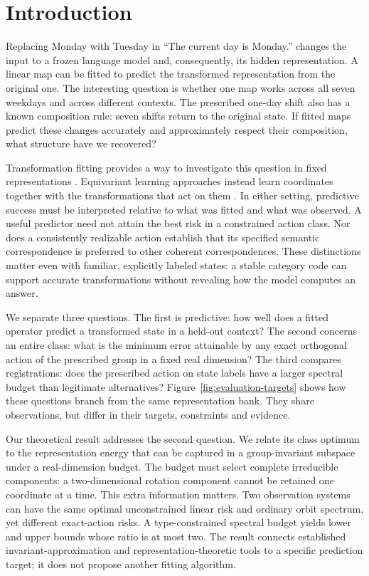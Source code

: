 \section{Introduction}
Replacing Monday with Tuesday in ``The current day is Monday.'' changes the input to a frozen language model and, consequently, its hidden representation. A linear map can be fitted to predict the transformed representation from the original one. The interesting question is whether one map works across all seven weekdays and across different contexts. The prescribed one-day shift also has a known composition rule: seven shifts return to the original state. If fitted maps predict these changes accurately and approximately respect their composition, what structure have we recovered?

Transformation fitting provides a way to investigate this question in fixed representations \citep{lenc2015understanding,sun2026transformationlaws}. Equivariant learning approaches instead learn coordinates together with the transformations that act on them \citep{schmidt2025equivariance}. In either setting, predictive success must be interpreted relative to what was fitted and what was observed. A useful predictor need not attain the best risk in a constrained action class. Nor does a consistently realizable action establish that its specified semantic correspondence is preferred to other coherent correspondences. These distinctions matter even with familiar, explicitly labeled states: a stable category code can support accurate transformations without revealing how the model computes an answer.

We separate three questions. The first is predictive: how well does a fitted operator predict a transformed state in a held-out context? The second concerns an entire class: what is the minimum error attainable by any exact orthogonal action of the prescribed group in a fixed real dimension? The third compares registrations: does the prescribed action on state labels have a larger spectral budget than legitimate alternatives? Figure~\ref{fig:evaluation-targets} shows how these questions branch from the same representation bank. They share observations, but differ in their targets, constraints and evidence.

Our theoretical result addresses the second question. We relate its class optimum to the representation energy that can be captured in a group-invariant subspace under a real-dimension budget. The budget must select complete irreducible components: a two-dimensional rotation component cannot be retained one coordinate at a time. This extra information matters. Two observation systems can have the same optimal unconstrained linear risk and ordinary orbit spectrum, yet different exact-action risks. A type-constrained spectral budget yields lower and upper bounds whose ratio is at most two. The result connects established invariant-approximation and representation-theoretic tools to a specific prediction target; it does not propose another fitting algorithm.


